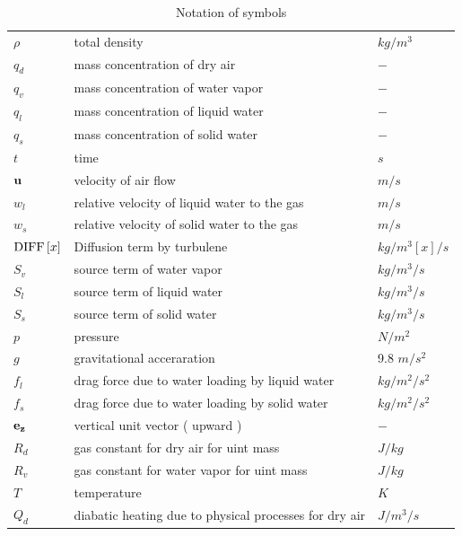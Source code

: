 \documentclass[a4paper]{report}
\begin{document}
\begin{table}[p]
  \caption{Notation of symbols}
  \begin{tabular}{lll}\hline
    $\rho$ & total density                       &  $kg/m^3$\\
    $q_d$  & mass concentration of dry air       &  $-$   \\
    $q_v$  & mass concentration of water vapor   &  $-$   \\
    $q_l$  & mass concentration of liquid water &   $-$   \\
    $q_s$  & mass concentration of solid water &    $-$   \\
    $t$    & time                              &   $s$   \\
    ${\bf u}$  & velocity of air flow          &   $m/s$   \\
    $w_l$  & relative velocity of liquid water to the gas    &   $m/s$   \\
    $w_s$  & relative velocity of solid water to the gas    &    $m/s$   \\
    ${\rm DIFF}\left[ x \right]$  & Diffusion term by turbulene  &    $kg/m^3\left[x\right]/s$   \\
    $S_v$    & source term of water vapor                     &    $kg/m^3/s$   \\
    $S_l$    & source term of liquid water                     &   $kg/m^3/s$   \\
    $S_s$    & source term of solid water                     &    $kg/m^3/s$   \\
    $p$      & pressure                                       &   $N/m^2$  \\
    $g$      & gravitational acceraration                     &   9.8 $m/s^2$ \\
    $f_l$      & drag force due to water loading by liquid water  &   $kg /m^2/s^2$ \\
    $f_s$      & drag force due to water loading by solid water   &   $kg /m^2/s^2$ \\
    ${\bf e_z}$ & vertical unit vector ( upward )                 &  $-$ \\
    $R_d$ & gas constant for dry air for uint mass               &  $J/kg$ \\
    $R_v$ & gas constant for water vapor for uint mass               &  $J/kg$ \\
    $T$   & temperature                                          & $K$ \\
    $Q_d$   & diabatic heating due to physical processes for dry air  & $J/m^3/s$ \\

\end{tabular}
\end{table}
\end{document}
